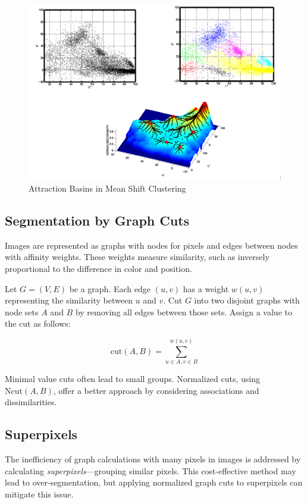 \begin{figure}[h]
	\centering
	\includegraphics[width=0.7\linewidth]{img/attraction_basins}
	\caption{Attraction Basins in Mean Shift Clustering}
\end{figure}

\subsection{Segmentation by Graph Cuts}

Images are represented as graphs with nodes for pixels and edges between nodes with affinity weights.
These weights measure similarity, such as inversely proportional to the difference in color and position.

\begin{definition}
	Let $G=(V,E)$ be a graph. Each edge $(u,v)$ has a weight $w(u,v)$ representing the similarity between $u$ and $v$.
	Cut $G$ into two disjoint graphs with node sets $A$ and $B$ by removing all edges between those sets.
	Assign a value to the cut as follows:

	\[
	\text{cut}(A,B) = \sum_{u\in A,v\in B}^{w(u,v)}
	\]
\end{definition}

Minimal value cuts often lead to small groups. Normalized cuts, using $\text{Ncut}(A,B)$,
offer a better approach by considering associations and dissimilarities.

\subsection{Superpixels}

The inefficiency of graph calculations with many pixels in images is addressed by calculating \emph{superpixels}—grouping similar pixels.
This cost-effective method may lead to over-segmentation, but applying normalized graph cuts to superpixels can mitigate this issue.

